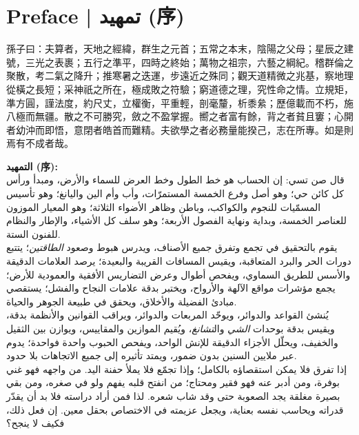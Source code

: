 \documentclass[11pt,a4paper]{article}
\newcommand{\ar}[1]{\arabicfont\beginR #1\endR}
\newcommand{\zh}[1]{{\CJKfamily{}#1}}
\begin{document}
\newpage

\section*{Preface | \ar{تمهيد} (\zh{序})}
\addcontentsline{toc}{section}{Preface (\zh{序}) | \ar{تمهيد}}

\begin{tcolorbox}[colback=chinesebg,colframe=rulecolor,boxrule=0.8pt,
  left=10pt,right=10pt,top=8pt,bottom=8pt,arc=2mm]
\zh{\large
孫子曰：夫算者，天地之經緯，群生之元首；五常之本末，陰陽之父母；星辰之建號，三光之表裹；五行之準平，四時之終始；萬物之祖宗，六藝之綱紀。稽群倫之聚散，考二氣之降升；推寒暑之迭運，步遠近之殊同；觀天道精微之兆基，察地理從橫之長短；采神祇之所在，極成敗之符驗；窮道德之理，究性命之情。立規矩，準方圓，謹法度，約尺丈，立權衡，平重輕，剖毫釐，析黍絫；歷億載而不朽，施八極而無疆。散之不可勝究，斂之不盈掌握。嚮之者富有餘，背之者貧且窶；心開者幼沖而即悟，意閉者皓首而難精。夫欲學之者必務量能揆己，志在所專。如是則焉有不成者哉。}
\end{tcolorbox}

\vspace{0.5cm}

\begin{tcolorbox}[colback=arabicbg,colframe=rulecolor!70!green,boxrule=0.8pt,
  left=10pt,right=10pt,top=8pt,bottom=8pt,arc=2mm]
\arabicfont\large\raggedleft
\textbf{التمهيد (序):}\\[0.5em]
قال صن تسي: إن الحساب هو خط الطول وخط العرض للسماء والأرض، ومبدأ ورأس كل كائن حي؛ وهو أصل وفرع الخمسة المستمرّات، وأب وأم الين واليانغ؛ وهو تأسيس المسمّيات للنجوم والكواكب، وباطن وظاهر الأضواء الثلاثة؛ وهو المعيار الموزون للعناصر الخمسة، وبداية ونهاية الفصول الأربعة؛ وهو سلف كل الأشياء، والإطار والنظام للفنون الستة.\\[0.5em]
يقوم بالتحقيق في تجمع وتفرق جميع الأصناف، ويدرس هبوط وصعود \textit{الطاقتين}؛ يتتبع دورات الحر والبرد المتعاقبة، ويقيس المسافات القريبة والبعيدة؛ يرصد العلامات الدقيقة والأسس للطريق السماوي، ويفحص أطوال وعرض التضاريس الأفقية والعمودية للأرض؛ يجمع مؤشرات مواقع الآلهة والأرواح، ويختبر بدقة علامات النجاح والفشل؛ يستقصي مبادئ الفضيلة والأخلاق، ويحقق في طبيعة الجوهر والحياة.\\[0.5em]
يُنشئ القواعد والدوائر، ويوحّد المربعات والدوائر، ويراقب القوانين والأنظمة بدقة، ويقيس بدقة بوحدات \textit{الشي} وال\textit{تشانغ}، ويُقيم الموازين والمقاييس، ويوازن بين الثقيل والخفيف، ويحلّل الأجزاء الدقيقة للإنش الواحد، ويفحص الحبوب واحدة فواحدة؛ يدوم عبر ملايين السنين بدون ضمور، ويمتد تأثيره إلى جميع الاتجاهات بلا حدود.\\[0.5em]
إذا تفرق فلا يمكن استقصاؤه بالكامل؛ وإذا تجمّع فلا يملأ حفنة اليد. من واجهه فهو غني بوفرة، ومن أدبر عنه فهو فقير ومحتاج؛ من انفتح قلبه يفهم ولو في صغره، ومن بقي بصيرة مغلقة يجد الصعوبة حتى وقد شاب شعره. لذا فمن أراد دراسته فلا بد أن يقدّر قدراته ويحاسب نفسه بعناية، ويجعل عزيمته في الاختصاص بحقل معين. إن فعل ذلك، فكيف لا ينجح؟
\end{tcolorbox}
\end{document}
